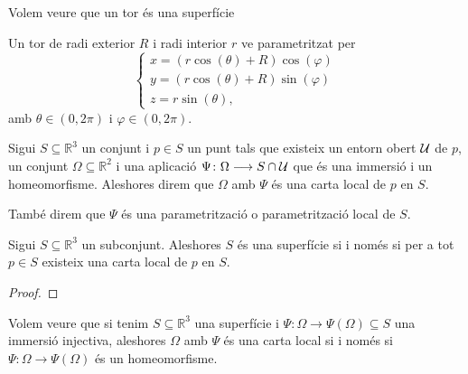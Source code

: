 \documentclass[../../Main.tex]{subfiles}
\begin{document}
	\begin{example}
		\label{ex:un tor és una superfície}
		Volem veure que un tor és una superfície
		\begin{solution}
			Un tor de radi exterior \(R\) i radi interior \(r\) ve parametritzat per
			\[\begin{cases*}
				x=(r\cos(\theta)+R)\cos(\varphi) \\
				y=(r\cos(\theta)+R)\sin(\varphi) \\
				z=r\sin(\theta),
			\end{cases*}\]
			amb \(\theta\in(0,2\pi)\) i \(\varphi\in(0,2\pi)\).
		\end{solution}
	\end{example}
	\begin{definition}
		\label{def:carta local}
		\label{def:parametrització local d'una superfície}
		\label{def:parametrització d'una superfície}
		Sigui \(S\subseteq\mathbb{R}^{3}\) un conjunt i \(p\in S\) un punt tals que existeix un entorn obert \(\mathcal{U}\) de \(p\), un conjunt \(\Omega\subseteq\mathbb{R}^{2}\) i una aplicació \(\Psi\colon\Omega\longrightarrow S\cap\mathcal{U}\) que és una immersió i un homeomorfisme. Aleshores direm que \(\Omega\) amb \(\Psi\) és una carta local de \(p\) en \(S\).
		
		També direm que \(\Psi\) és una parametrització o parametrització local de \(S\).
	\end{definition}
	\begin{theorem}
		\label{thm:ser superfície és equivalent a tenir cartes locals}
		Sigui \(S\subseteq\mathbb{R}^{3}\) un subconjunt. Aleshores \(S\) és una superfície si i només si per a tot \(p\in S\) existeix una carta local de \(p\) en \(S\).
		\begin{proof}
		\end{proof}
	\end{theorem}
	\begin{example}
		Volem veure que si tenim \(S\subseteq\mathbb{R}^{3}\) una superfície i \(\Psi\colon\Omega\longrightarrow\Psi(\Omega)\subseteq S\) una immersió injectiva, aleshores \(\Omega\) amb \(\Psi\) és una carta local si i només si \(\Psi\colon\Omega\longrightarrow\Psi(\Omega)\) és un homeomorfisme.
		\begin{solution}
		\end{solution}
	\end{example}
\end{document}
